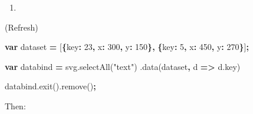 \documentclass[openany]{book}
\newenvironment{Shaded}{\begin{snugshade}}{\end{snugshade}}
\newcommand{\AttributeTok}[1]{\textcolor[rgb]{0.77,0.63,0.00}{#1}}
\newcommand{\DataTypeTok}[1]{\textcolor[rgb]{0.13,0.29,0.53}{#1}}
\newcommand{\DecValTok}[1]{\textcolor[rgb]{0.00,0.00,0.81}{#1}}
\newcommand{\KeywordTok}[1]{\textcolor[rgb]{0.13,0.29,0.53}{\textbf{#1}}}
\newcommand{\NormalTok}[1]{#1}
\newcommand{\OperatorTok}[1]{\textcolor[rgb]{0.81,0.36,0.00}{\textbf{#1}}}
\newcommand{\SpecialCharTok}[1]{\textcolor[rgb]{0.00,0.00,0.00}{#1}}
\newcommand{\StringTok}[1]{\textcolor[rgb]{0.31,0.60,0.02}{#1}}
\newcommand{\VariableTok}[1]{\textcolor[rgb]{0.00,0.00,0.00}{#1}}
\newcommand{\VerbatimStringTok}[1]{\textcolor[rgb]{0.31,0.60,0.02}{#1}}
\begin{document}
\begin{enumerate}
\def\labelenumi{\arabic{enumi}.}
\setcounter{enumi}{1}
\item
\end{enumerate}

(Refresh)

\begin{Shaded}
\begin{Highlighting}[]
\KeywordTok{var}\NormalTok{ dataset }\OperatorTok{=}\NormalTok{ [}\OperatorTok{\{}\DataTypeTok{key}\OperatorTok{:} \DecValTok{23}\OperatorTok{,} \DataTypeTok{x}\OperatorTok{:} \DecValTok{300}\OperatorTok{,} \DataTypeTok{y}\OperatorTok{:} \DecValTok{150}\OperatorTok{\},}
              \OperatorTok{\{}\DataTypeTok{key}\OperatorTok{:} \DecValTok{5}\OperatorTok{,} \DataTypeTok{x}\OperatorTok{:} \DecValTok{450}\OperatorTok{,} \DataTypeTok{y}\OperatorTok{:} \DecValTok{270}\OperatorTok{\}}\NormalTok{]}\OperatorTok{;}
              
\KeywordTok{var}\NormalTok{ databind }\OperatorTok{=} \VariableTok{svg}\NormalTok{.}\AttributeTok{selectAll}\NormalTok{(}\StringTok{"text"}\NormalTok{)}
\NormalTok{  .}\AttributeTok{data}\NormalTok{(dataset}\OperatorTok{,}\NormalTok{ d }\OperatorTok{=>} \VariableTok{d}\NormalTok{.}\AttributeTok{key}\NormalTok{)}

\VariableTok{databind}\NormalTok{.}\AttributeTok{exit}\NormalTok{().}\AttributeTok{remove}\NormalTok{()}\OperatorTok{;}
\end{Highlighting}
\end{Shaded}

Then:

\begin{Shaded}
\end{Shaded}
\end{document}
